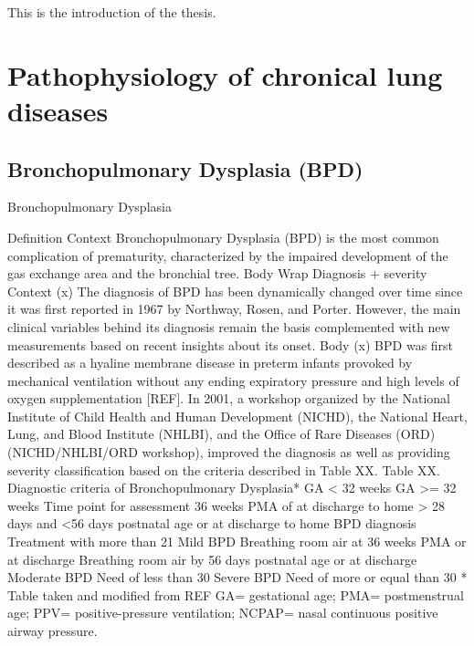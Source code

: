This is the introduction of the thesis.

\section{Pathophysiology of chronical lung diseases}
    \subsection{Bronchopulmonary Dysplasia (BPD)}
   Bronchopulmonary Dysplasia

Definition
Context
Bronchopulmonary Dysplasia (BPD) is the most common complication of prematurity, characterized by the impaired development of the gas exchange area and the bronchial tree.
Body
Wrap
Diagnosis + severity
Context (x)
The diagnosis of BPD has been dynamically changed over time since it was first reported in 1967 by Northway, Rosen, and Porter. However, the main clinical variables behind its diagnosis remain the basis complemented with new measurements based on recent insights about its onset.
Body (x)
BPD was first described as a hyaline membrane disease in preterm infants provoked by mechanical ventilation without any ending expiratory pressure and high levels of oxygen supplementation [REF]. In 2001, a workshop organized by the National Institute of Child Health and Human Development (NICHD), the National Heart, Lung, and Blood Institute (NHLBI), and the Office of Rare Diseases (ORD) (NICHD/NHLBI/ORD workshop), improved the diagnosis as well as providing severity classification based on the criteria described in Table XX.
Table XX. Diagnostic criteria of Bronchopulmonary Dysplasia*
	GA < 32 weeks	GA >= 32 weeks
Time point for assessment	36 weeks PMA of at discharge to home	> 28 days and <56 days postnatal age or at discharge to home
BPD diagnosis	Treatment with more than 21%
Mild BPD	Breathing room air at 36 weeks PMA or at discharge	Breathing room air by 56 days postnatal age or at discharge
Moderate BPD	Need of less than 30%
Severe BPD	Need of more or equal than 30%
* Table taken and modified from REF
GA= gestational age; PMA= postmenstrual age; PPV= positive-pressure ventilation; NCPAP= nasal continuous positive airway pressure.

